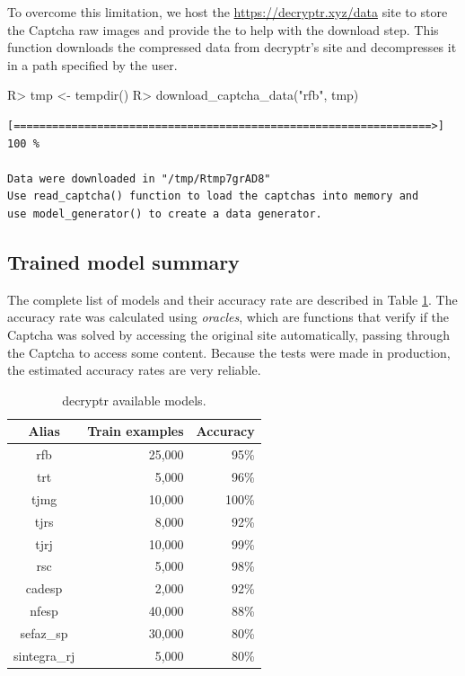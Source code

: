 \documentclass[article,nojss]{jss}
\begin{document}
To overcome this limitation, we host the \url{https://decryptr.xyz/data}
site to store the Captcha raw images and provide the
 to help with the download step. This
function downloads the compressed data from decryptr's site and
decompresses it in a path specified by the user.

\begin{CodeChunk}

\begin{CodeInput}
R> tmp <- tempdir()
R> download_captcha_data("rfb", tmp)
\end{CodeInput}
\end{CodeChunk}

\begin{verbatim}
[=================================================================>]  100 %

Data were downloaded in "/tmp/Rtmp7grAD8"
Use read_captcha() function to load the captchas into memory and
use model_generator() to create a data generator.
\end{verbatim}

\hypertarget{trained-model-summary}{%
\subsection{Trained model summary}\label{trained-model-summary}}

The complete list of models and their accuracy rate are described in
Table \ref{tab:model-summary}. The accuracy rate was calculated using
\emph{oracles}, which are functions that verify if the Captcha was
solved by accessing the original site automatically, passing through the
Captcha to access some content. Because the tests were made in
production, the estimated accuracy rates are very reliable.

\begin{CodeChunk}
\begin{table}[t]

\caption{\label{tab:model-summary}decryptr available models.}
\centering
\begin{tabular}{crr}
\toprule
Alias & Train examples & Accuracy\\
\midrule
rfb & 25,000 & 95\%\\
trt & 5,000 & 96\%\\
tjmg & 10,000 & 100\%\\
tjrs & 8,000 & 92\%\\
tjrj & 10,000 & 99\%\\
rsc & 5,000 & 98\%\\
cadesp & 2,000 & 92\%\\
nfesp & 40,000 & 88\%\\
sefaz\_sp & 30,000 & 80\%\\
sintegra\_rj & 5,000 & 80\%\\
\bottomrule
\end{tabular}
\end{table}

\end{CodeChunk}
\end{document}
